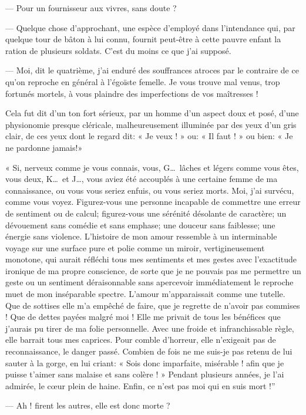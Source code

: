 --- Pour un fournisseur aux vivres, sans
doute ?

--- Quelque chose d’approchant, une espèce
d’employé dans l’intendance qui, par
quelque tour de bâton à lui connu, fournit peut{}-être à cette pauvre
enfant la ration de plusieurs soldats. C’est du moins
ce que j’ai supposé.

--- Moi, dit le quatrième, j’ai enduré des souffrances
atroces par le contraire de ce qu’on reproche en
général à l’égoïste femelle. Je vous trouve mal venus,
trop fortunés mortels, à vous plaindre des imperfections de vos
maîtresses !

Cela fut dit d’un ton fort sérieux, par un homme
d’un aspect doux et posé, d’une
physionomie presque cléricale, malheureusement illuminée par des yeux
d’un gris clair, de ces yeux dont le regard dit: « Je
veux ! » ou: « Il faut ! » ou bien: « Je ne pardonne jamais!»

« Si, nerveux comme je vous connais, vous, G\ldots\ lâches et légers comme
vous êtes, vous deux, K\ldots\ et J\ldots, vous aviez été accouplés à une
certaine femme de ma connaissance, ou vous vous seriez enfuis, ou vous
seriez morts. Moi, j’ai survécu, comme vous voyez.
Figurez{}-vous une personne incapable de commettre une erreur de
sentiment ou de calcul; figurez{}-vous une sérénité désolante de
caractère; un dévouement sans comédie et sans emphase; une douceur sans
faiblesse; une énergie sans violence. L’histoire de
mon amour ressemble à un interminable voyage sur une surface pure et
polie comme un miroir, vertigineusement monotone, qui aurait réfléchi
tous mes sentiments et mes gestes avec l’exactitude
ironique de ma propre conscience, de sorte que je ne pouvais pas me
permettre un geste ou un sentiment déraisonnable sans apercevoir
immédiatement le reproche muet de mon inséparable spectre.
L’amour m’apparaissait comme une
tutelle. Que de sottises elle m’a empêché de faire,
que je regrette de n’avoir pas commises ! Que de
dettes payées malgré moi ! Elle me privait de tous les bénéfices que
j’aurais pu tirer de ma folie personnelle. Avec une
froide et infranchissable règle, elle barrait tous mes caprices. Pour
comble d’horreur, elle n’exigeait pas
de reconnaissance, le danger passé. Combien de fois ne me suis{}-je pas
retenu de lui sauter à la gorge, en lui criant: « Sois donc imparfaite,
misérable ! afin que je puisse t’aimer sans malaise et
sans colère ! » Pendant plusieurs années, je l’ai
admirée, le c\oe ur plein de haine. Enfin, ce n’est pas
moi qui en suis mort !''

--- Ah ! firent les autres, elle est donc morte ?

